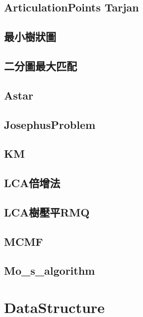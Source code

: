     \subsection{ArticulationPoints Tarjan}
        
    \subsection{最小樹狀圖}
        
    \subsection{二分圖最大匹配}
        
    \subsection{Astar}
        
    \subsection{JosephusProblem}
        
    \subsection{KM}
        
    \subsection{LCA倍增法}
        
    \subsection{LCA樹壓平RMQ}
        
    \subsection{MCMF}
        
    \subsection{Mo_s_algorithm}
        

\section{DataStructure}
